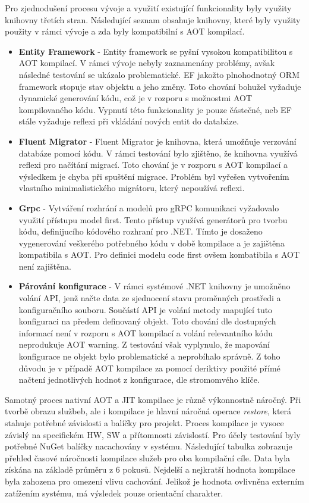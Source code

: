 
Pro zjednodušení procesu vývoje a využití existující funkcionality byly využity knihovny třetích stran. Následující seznam obsahuje knihovny, které byly využity použity v rámci vývoje a zda byly kompatibilní s AOT kompilací.

\begin{itemize}
  \item \textbf{Entity Framework} - Entity framework se pyšní vysokou kompatibilitou s AOT kompilací. V rámci vývoje nebyly zaznamenány problémy, avšak následné testování se ukázalo problematické. EF jakožto plnohodnotný ORM framework stopuje stav objektu a jeho změny. Toto chování bohužel vyžaduje dynamické generování kódu, což je v rozporu s možnostmi AOT kompilovaného kódu. Vypnutí této funkcionality je pouze částečné, neb EF stále vyžaduje reflexi při vkládání nových entit do databáze.
  \item \textbf{Fluent Migrator} - Fluent Migrator je knihovna, která umožňuje verzování databáze pomocí kódu. V rámci testování bylo zjištěno, že knihovna využívá reflexi pro načítání migrací. Toto chování je v rozporu s AOT kompilací a výsledkem je chyba při spuštění migrace. Problém byl vyřešen vytvořením vlastního minimalistického migrátoru, který nepoužívá reflexi.
  \item \textbf{Grpc} - Vytváření rozhrání a modelů pro gRPC komunikaci vyžadovalo využití přístupu model first. Tento přístup využívá generátorů pro tvorbu kódu, definijucího kódového rozhraní pro .NET. Tímto je dosaženo vygenerování veškerého potřebného kódu v době kompilace a je zajištěna kompatibila s AOT. Pro definici modelu code first ovšem kombatibila s AOT není zajištěna.
  \item \textbf{Párování konfigurace} - V rámci systémové .NET knihovny je umožněno volání API, jenž načte data ze sjednocení stavu proměnných prostředi a konfiguračního souboru. Součástí API je volání metody mapující tuto konfiguraci na předem definovaný objekt. Toto chování dle dostupných informací není v rozporu s AOT kompilací a volání relevantního kódu neprodukuje AOT warning. Z testování však vyplynulo, že mapování konfigurace ne objekt bylo problematické a neprobíhalo správně. Z toho důvodu je v případě AOT kompilace za pomocí deriktivy použité přímé načtení jednotlivých hodnot z konfigurace, dle stromomvého klíče.
\end{itemize}


Samotný proces nativní AOT a JIT kompilace je různě výkonnostně náročný. Při tvorbě obrazu službeb, ale i kompilace je hlavní náročná operace \emph{restore}, která stahuje potřebné závislosti a balíčky pro projekt. Proces kompilace je vysoce závislý na specifickém HW, SW a přítomnosti závislostí. Pro účely testování byly potřebné NuGet balíčky nacachovány v systému. Následující tabulka zobrazuje přehled časové náročnosti kompilace služeb pro oba kompilační cíle. Data byla získána na základě průměru z 6 pokusů. Nejdelší a nejkratší hodnota kompilace byla zahozena pro omezení vlivu cachování. Jelikož je hodnota ovlivněna externím zatížením systému, má výsledek pouze orientační charakter.

